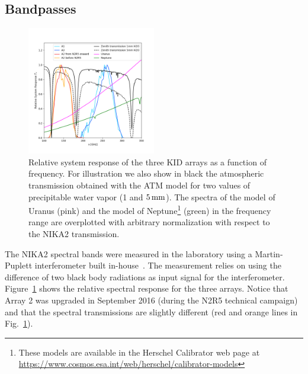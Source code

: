 \subsection{Bandpasses}
\label{se:instru_bandpass}

\begin{figure}[ht!] %
\begin{center}
\includegraphics[clip,trim={0, 1cm, 0, 2cm},width=0.5\textwidth]{Figures/bandpasses_nika2_colorsok.png}
\caption[NIKA2 transmission]{Relative system response of the three KID
  arrays as a
  function of frequency. For illustration we also show in black
  the atmospheric transmission obtained with the ATM model \citep{ATM,
    Pardo2002} for two values of precipitable water vapor (1 and
  $5\,\rm{mm}$).
  The spectra of the model of Uranus (pink) and the model of
  Neptune\footnote{These models are available in the Herschel
    Calibrator web page at
    \url{https://www.cosmos.esa.int/web/herschel/calibrator-models}}
  (green) in the frequency range are overplotted with arbitrary
  normalization with respect to the NIKA2 transmission.} 
 \label{spectralband1}
\end{center}
\end{figure}

The NIKA2 spectral bands were measured in the laboratory using a
Martin-Puplett interferometer built in-house~\citep{Durand2007_these}.
The measurement relies on using the difference of two black
body radiations as input signal for the interferometer. 
Figure~\ref{spectralband1} shows the relative spectral response for
the three arrays.  Notice that Array 2 was
upgraded in September 2016 (during the N2R5 technical campaign) and
that the spectral transmissions are slightly different (red and orange lines in
Fig.~\ref{spectralband1}).

